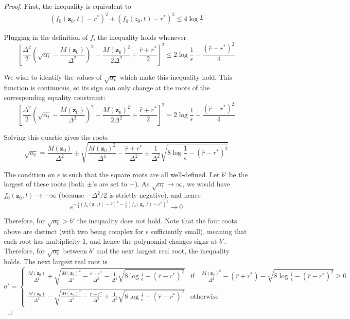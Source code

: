 \documentclass[10pt,a4paper]{amsart}
\newcommand{\fitbracket}[1]{\left[#1\right]}
\newcommand{\fitparenth}[1]{\left(#1\right)}
\newcommand{\separation}{\Delta}
\newcommand{\vect}[1]{\mathbf{#1}}
\begin{document}
\begin{proof}
    First, the inequality is equivalent to 
    \begin{align*}
       \fitparenth{f_0(\vect z_0,t)-r^*}^2+\fitparenth{f_0(z_0,t)-r^*}^2\leq 4\log \frac{1}{\epsilon}
    \end{align*}

    
    
    
    Plugging in the definition of $f$, the inequality holds whenever 
    \[\fitbracket{\frac{\separation^2}{2} \fitparenth{\sqrt{\alpha_t}-\frac{M(\vect z_0)}{\separation^2}}^2 - \frac{M(\vect z_0)^2}{2\separation^2}+ \frac{\hat r+r^*}{2}}^2 \leq 2\log \frac{1}{\epsilon}-\frac{(\hat r-r^*)^2}{4} \]
    
    We wish to identify the values of $\sqrt{\alpha_t}$ which make this inequality hold. This function is continuous, so its sign can only change at the roots of the corresponding equality constraint:
    \[\fitbracket{\frac{\separation^2}{2} \fitparenth{\sqrt{\alpha_t}-\frac{M(\vect z_0)}{\separation^2}}^2 - \frac{M(\vect z_0)^2}{2\separation^2}+ \frac{\hat r+r^*}{2}}^2 = 2\log \frac{1}{\epsilon}-\frac{(\hat r -r^*)^2}{4}\]

    Solving this quartic gives the roots
    \[\sqrt{\alpha_t}=\frac{M(\vect z_0)}{\separation^2} \pm\sqrt{\frac{M(\vect z_0)^2}{\separation^4}-\frac{\hat r+r^*}{\separation^2}\pm \frac{1}{\separation^2}\sqrt{8\log \frac{1}{\epsilon}-(\hat r-r^*)^2}}\]
    
    The condition on $\epsilon$ is such that the square roots are all well-defined. Let $b'$ be the largest of these roots (both $\pm$'s are set to $+$). As $\sqrt{\alpha_t}\rightarrow \infty$, we would have $f_0(\vect z_0,t)\rightarrow -\infty$ (because $-\separation^2/2$ is strictly negative), and hence 
    \[e^{-\frac{1}{4}\fitparenth{f_0(\vect z_0,t)-\hat r }^2-\frac{1}{4}\fitparenth{f_0(\vect z_0,t)-r^*}^2} \rightarrow 0\]
    
    Therefore, for $\sqrt{\alpha_t}>b'$ the inequality does not hold. Note that the four roots above are distinct (with two being complex for $\epsilon$ sufficiently small), meaning that each root has multiplicity 1, and hence the polynomial changes signs at $b'$. Therefore, for $\sqrt{\alpha_t}$ between $b'$ and the next largest real root, the inequality holds. The next largest real root is
    \[a'=\begin{cases}
        \frac{M(\vect z_0)}{\separation^2} +\sqrt{\frac{M(\vect z_0)^2}{\separation^4}-\frac{\hat r+r^*}{\separation^2}-\frac{1}{\separation^2}\sqrt{8\log \frac{1}{\epsilon}-(\hat r-r^*)^2}} & \text{if}\quad \frac{M(\vect z_0)^2}{\separation^2}-(\hat r+r^*)-\sqrt{8\log \frac{1}{\epsilon}-(\hat r-r^*)^2} \geq0
        \\
        \frac{M(\vect z_0)}{\separation^2} -\sqrt{\frac{M(\vect z_0)^2}{\separation^4}-\frac{\hat r+r^*}{\separation^2}+\frac{1}{\separation^2}\sqrt{8\log \frac{1}{\epsilon}-(\hat r-r^*)^2}} & \text{otherwise}
    \end{cases}\]
    

\end{proof}
\end{document}
